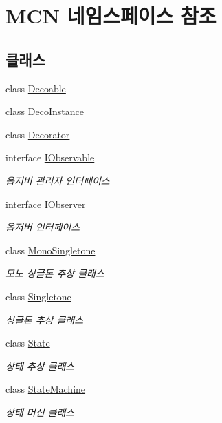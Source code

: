 \hypertarget{namespace_m_c_n}{}\section{M\+CN 네임스페이스 참조}
\label{namespace_m_c_n}
\subsection*{클래스}
\begin{DoxyCompactItemize}
\item 
class \hyperlink{class_m_c_n_1_1_decoable}{Decoable}
\item 
class \hyperlink{class_m_c_n_1_1_deco_instance}{Deco\+Instance}
\item 
class \hyperlink{class_m_c_n_1_1_decorator}{Decorator}
\item 
interface \hyperlink{interface_m_c_n_1_1_i_observable}{I\+Observable}
\begin{DoxyCompactList}\small\item\em 옵저버 관리자 인터페이스 \end{DoxyCompactList}\item 
interface \hyperlink{interface_m_c_n_1_1_i_observer}{I\+Observer}
\begin{DoxyCompactList}\small\item\em 옵저버 인터페이스 \end{DoxyCompactList}\item 
class \hyperlink{class_m_c_n_1_1_mono_singletone}{Mono\+Singletone}
\begin{DoxyCompactList}\small\item\em 모노 싱글톤 추상 클래스 \end{DoxyCompactList}\item 
class \hyperlink{class_m_c_n_1_1_singletone}{Singletone}
\begin{DoxyCompactList}\small\item\em 싱글톤 추상 클래스 \end{DoxyCompactList}\item 
class \hyperlink{class_m_c_n_1_1_state}{State}
\begin{DoxyCompactList}\small\item\em 상태 추상 클래스 \end{DoxyCompactList}\item 
class \hyperlink{class_m_c_n_1_1_state_machine}{State\+Machine}
\begin{DoxyCompactList}\small\item\em 상태 머신 클래스 \end{DoxyCompactList}\end{DoxyCompactItemize}

